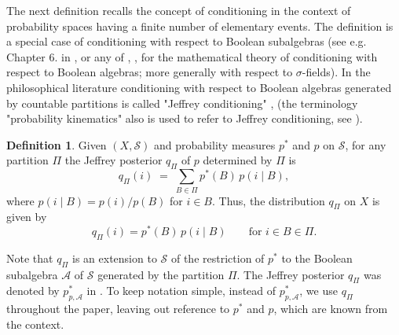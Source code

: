 \documentclass[10pt, letterpaper]{article}%
\theoremstyle{definition}
\newtheorem{definition}[theorem]{Definition}
\newcommand{\1}{\mathbf 1}
\begin{document}
The next definition recalls the concept of conditioning in the context of probability spaces having a finite number of elementary events. The definition is a special case of conditioning with respect to Boolean subalgebras (see e.g. Chapter 6. in \cite{Billingsley1995}, or any of \cite{Williams1991}, \cite{Ash-Doleans-Dade1999}, \cite{Rosenthal2006} for the mathematical theory of conditioning with respect to Boolean algebras; more generally with respect to $\sigma$-fields). In the philosophical literature conditioning with respect to Boolean algebras generated by countable partitions is called "Jeffrey conditioning" \cite{Jeffrey1983}, \cite{Jeffrey1992} (the terminology "probability kinematics" also is used to refer to Jeffrey conditioning, see \cite{Diaconis-Zabell1982}).    
\begin{definition}
Given $(X,\mathcal{S})$ and probability measures $p^*$ and $p$ on $\mathcal{S}$, for any partition $\Pi$ the Jeffrey posterior $q_{\Pi}$ of $p$ determined by $\Pi$ is
\begin{equation}\label{eq:Jeffrey-mixture}
q_{\Pi}(i)\;=\; \sum_{B\in\Pi} p^*(B)\, p(i\mid B),
\end{equation}
where $p(i\mid B)=p(i)/p(B)$ for $i\in B$. Thus, the distribution $q_\Pi$ on $X$ is given by
\[
q_\Pi(i)=p^*(B)\,p(i\mid B)\qquad\text{for }i\in B\in\Pi.
\]
\end{definition}
Note that $q_{\Pi}$ is an extension to $\mathcal{S}$ of the restriction of $p^*$ to the Boolean subalgebra $\mathcal{A}$ of $\mathcal{S}$ generated by the partition $\Pi$. The Jeffrey posterior $q_{\Pi}$ was denoted by $p^*_{p,\mathcal{A}}$ in \cite{Redei-Jing2026}. To keep notation simple, instead of $p^*_{p,\mathcal{A}}$, we use $q_{\Pi}$ throughout the paper, leaving out reference to $p^*$ and $p$, which are known from the context. 
\end{document}
